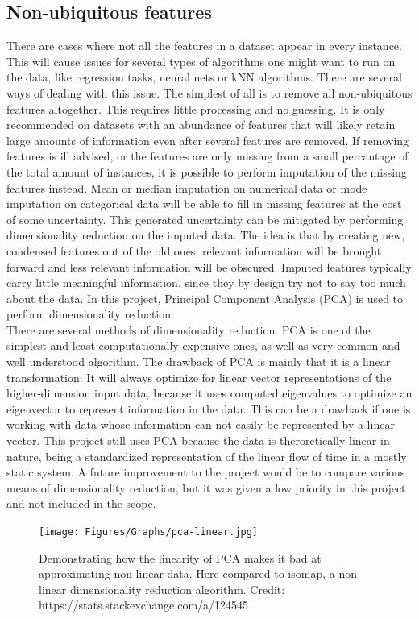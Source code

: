\subsection*{Non-ubiquitous features}
\label{Non-ubiquitous}
There are cases where not all the features in a dataset appear in every instance.
This will cause issues for several types of algorithms one might want to run on the data, like regression tasks, neural nets or kNN algorithms.
There are several ways of dealing with this issue.
The simplest of all is to remove all non-ubiquitous features altogether.
This requires little processing and no guessing.
It is only recommended on datasets with an abundance of features that will likely retain large amounts of information even after several features are removed.
If removing features is ill advised, or the features are only missing from a small percantage of the total amount of instances, it is possible to perform imputation of the missing features instead.
Mean or median imputation on numerical data or mode imputation on categorical data will be able to fill in missing features at the cost of some uncertainty.
This generated uncertainty can be mitigated by performing dimensionality reduction on the imputed data.
The idea is that by creating new, condensed features out of the old ones, relevant information will be brought forward and less relevant information will be obscured.
Imputed features typically carry little meaningful information, since they by design try not to say too much about the data.
In this project, Principal Component Analysis (PCA) is used to perform dimensionality reduction.\\

There are several methods of dimensionality reduction.
PCA is one of the simplest and least computationally expensive ones, as well as very common and well understood algorithm.
The drawback of PCA is mainly that it is a linear transformation:
It will always optimize for linear vector representations of the higher-dimension input data, because it uses computed eigenvalues to optimize an eigenvector to represent information in the data.
This can be a drawback if one is working with data whose information can not easily be represented by a linear vector.
This project still uses PCA because the data is theroretically linear in nature, being a standardized representation of the linear flow of time in a mostly static system.
A future improvement to the project would be to compare various means of dimensionality reduction, but it was given a low priority in this project and not included in the scope.

\begin{figure}[ht]
    \centering
    \texttt{[image: Figures/Graphs/pca-linear.jpg]}
    \caption{Demonstrating how the linearity of PCA makes it bad at approximating non-linear data. Here compared to isomap, a non-linear dimensionality reduction algorithm. Credit: https://stats.stackexchange.com/a/124545}
    \label{PCA-linearity}
\end{figure}

